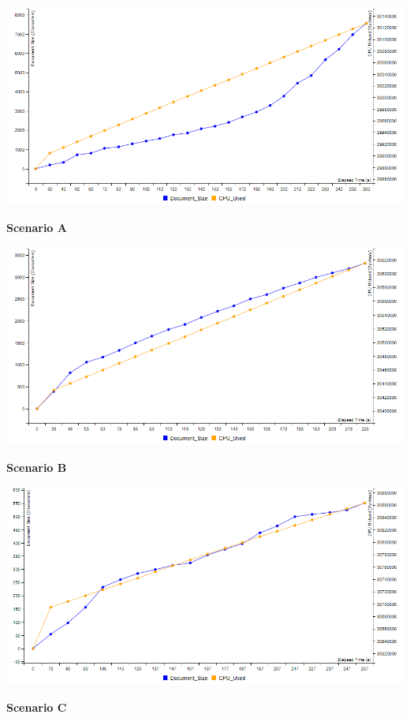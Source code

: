 \documentclass[12pt]{article}
\begin{document}
  \begin{center}
    \includegraphics[scale=0.48]{yjs_doc_size_S1.png}

    \textbf{Scenario A}
    
    \includegraphics[scale=0.48]{yjs_doc_size_S2.png}
    
    \textbf{Scenario B}
    
    \includegraphics[scale=0.48]{yjs_doc_size_S3.png}
    
    \textbf{Scenario C}
  \end{center}
\end{document}
